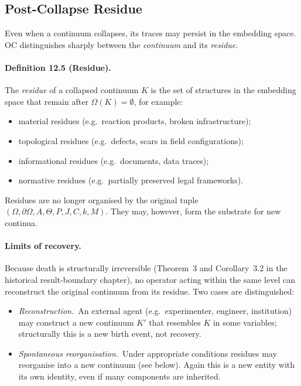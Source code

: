 \subsection{Post-Collapse Residue}

Even when a continuum collapses, its traces may persist in the embedding
space. OC distinguishes sharply between the \emph{continuum} and its
\emph{residue}.

\paragraph{Definition 12.5 (Residue).}
The \emph{residue} of a collapsed continuum \(K\) is the set of structures in
the embedding space that remain after \(\Omega(K)=\emptyset\), for example:
\begin{itemize}
  \item material residues (e.g.\ reaction products, broken infrastructure);
  \item topological residues (e.g.\ defects, scars in field configurations);
  \item informational residues (e.g.\ documents, data traces);
  \item normative residues (e.g.\ partially preserved legal frameworks).
\end{itemize}

Residues are no longer organised by the original tuple
\((\Omega,\partial\Omega,A,\Theta,P,J,C,k,M)\). They may, however, form the
substrate for new continua.

\paragraph{Limits of recovery.}
Because death is structurally irreversible
(Theorem~3 and Corollary~3.2 in the historical result-boundary chapter), no operator acting
within the same level can reconstruct the original continuum from its
residue. Two cases are distinguished:
\begin{itemize}
  \item \emph{Reconstruction.}\
        An external agent (e.g.\ experimenter, engineer, institution) may
        construct a new continuum \(K'\) that resembles \(K\) in some
        variables; structurally this is a new birth event, not recovery.
  \item \emph{Spontaneous reorganisation.}\
        Under appropriate conditions residues may reorganise into a new
        continuum (see below). Again this is a new entity with its own
        identity, even if many components are inherited.
\end{itemize}

